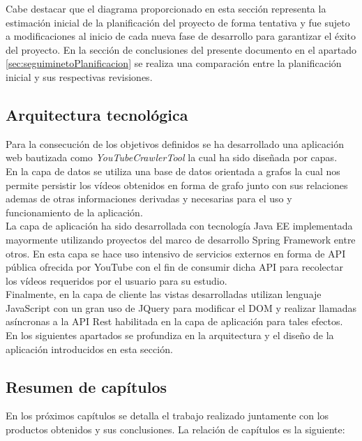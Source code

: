 \documentclass[11pt,a4paper]{article}
\begin{document}
Cabe destacar que el diagrama proporcionado en esta sección representa la estimación inicial de la planificación del proyecto de forma tentativa y fue sujeto a modificaciones al inicio de cada nueva fase de desarrollo para garantizar el éxito del proyecto. En la sección de conclusiones del presente documento en el apartado \ref{sec:seguiminetoPlanificacion} se realiza una comparación entre la planificación inicial y sus respectivas revisiones.
\newpage


\subsection{Arquitectura tecnológica}
Para la consecución de los objetivos definidos se ha desarrollado una aplicación web bautizada como \textit{YouTubeCrawlerTool} la cual ha sido diseñada por capas.
\\

En la capa de datos se utiliza una base de datos orientada a grafos \cite{10} la cual nos permite persistir los vídeos obtenidos en forma de grafo junto con sus relaciones ademas de otras informaciones derivadas y necesarias para el uso y funcionamiento de la aplicación.
\\

La capa de aplicación ha sido desarrollada con tecnología Java EE \cite{11} implementada mayormente utilizando proyectos del marco de desarrollo Spring Framework \cite{12} entre otros. En esta capa se hace uso intensivo de servicios externos en forma de API pública ofrecida por YouTube con el fin de consumir dicha API para recolectar los vídeos requeridos por el usuario para su estudio.
\\

Finalmente, en la capa de cliente las vistas desarrolladas utilizan lenguaje JavaScript \cite{13} con un gran uso de JQuery \cite{14} para modificar el DOM y realizar llamadas asíncronas a la API Rest habilitada en la capa de aplicación para tales efectos.
\\

En los siguientes apartados se profundiza en la arquitectura y el diseño de la aplicación introducidos en esta sección.
\medskip 

\subsection{Resumen de capítulos}
En los próximos capítulos se detalla el trabajo realizado juntamente con los productos obtenidos y sus conclusiones. La relación de capítulos es la siguiente:
\end{document}

